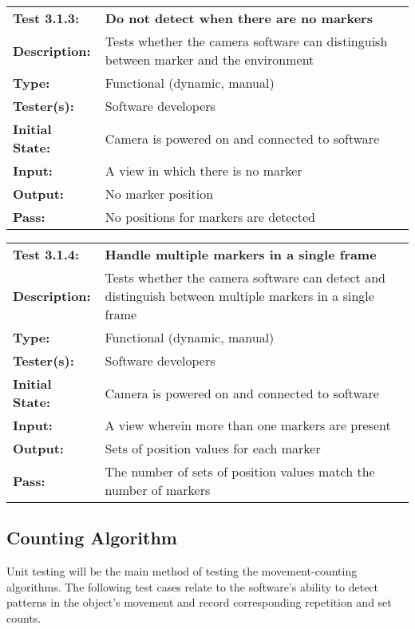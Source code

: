 \documentclass{article}
\newenvironment{testcase}
    {
    \begin{center}
    \begin{mdframed}[
        userdefinedwidth=15.5cm,
        leftmargin=1cm,
        rightmargin=1cm
        ]
    \begin{tabular}{p{2.5cm} p{9cm}}
    }
    {
    \end{tabular}
    \end{mdframed}
    \end{center}
    }
\newcommand{\tctit}[2]{\textbf{#1} & \textbf{#2}}
\newcommand{\tcdesc}{\textbf{Description:}}
\newcommand{\tctype}{\textbf{Type:}}
\newcommand{\testers}{\textbf{Tester(s):}}
\newcommand{\tcinit}{\textbf{Initial State:}}
\newcommand{\tcin}{\textbf{Input:}}
\newcommand{\tcout}{\textbf{Output:}}
\newcommand{\tcpass}{\textbf{Pass:}}
\begin{document}
\begingroup
\begin{testcase}
    \tctit{Test 3.1.3:}{Do not detect when there are no markers}\\
    \tcdesc & Tests whether the camera software can distinguish between marker and the environment \\
    \tctype & Functional (dynamic, manual) \\
    \testers & Software developers \\
    \tcinit & Camera is powered on and connected to software \\
    \tcin & A view in which there is no marker \\
    \tcout & No marker position \\
    \tcpass & No positions for markers are detected \\
\end{testcase}
\endgroup

\begingroup
\begin{testcase}
    \tctit{Test 3.1.4:}{Handle multiple markers in a single frame} \\
    \tcdesc & Tests whether the camera software can detect and distinguish between multiple markers in a single frame \\
    \tctype & Functional (dynamic, manual) \\
    \testers & Software developers \\
    \tcinit & Camera is powered on and connected to software \\
    \tcin & A view wherein more than one markers are present \\
    \tcout & Sets of position values for each marker \\
    \tcpass & The number of sets of position values match the number of markers \\
\end{testcase}
\endgroup

\subsection{Counting Algorithm}
Unit testing will be the main method of testing the movement-counting algorithms. The following test cases relate to the software’s ability to detect patterns in the object’s movement and record corresponding repetition and set counts.
\end{document}
